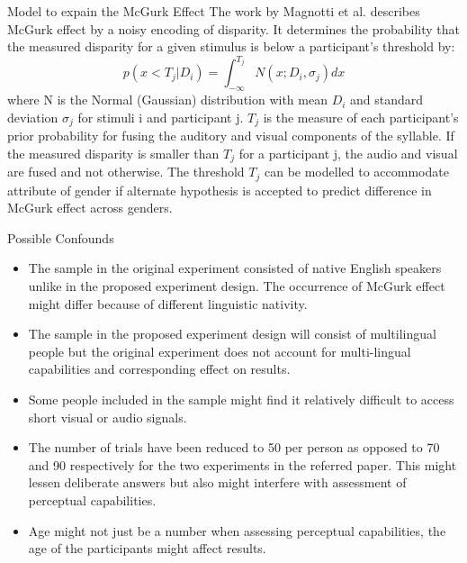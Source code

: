 \documentclass{article}
\begin{document}
\begin{psection}{Model to expain the McGurk Effect}
	The work by Magnotti et al. \cite{model} describes McGurk effect by a noisy encoding of disparity. It determines the probability that the measured disparity for a given stimulus is below a participant’s threshold by:
	\begin{equation}
		p(x < T_j | D_i) = \int_{-\infty}^{T_j} N(x;D_i,\sigma_j) dx 
	\end{equation}
	where N is the Normal (Gaussian) distribution with mean $D_i$ and standard deviation $\sigma_j$ for stimuli i and participant j. $T_j$ is the measure of each participant's prior probability for fusing the auditory and visual components of the syllable. If the measured disparity is smaller than $T_j$ for a participant j, the audio and visual are fused and not otherwise. The threshold $T_j$ can be modelled to accommodate attribute of gender if alternate hypothesis is accepted to predict difference in McGurk effect across genders.
\end{psection}

\begin{psection}{Possible Confounds}
	\begin{itemize}
		\item The sample in the original experiment consisted of native English speakers unlike in the proposed experiment design. The occurrence of McGurk effect might differ because of different linguistic nativity.
		\item The sample in the proposed experiment design will consist of multilingual people but the original experiment does not account for multi-lingual capabilities and corresponding effect on results.
		\item Some people included in the sample might find it relatively difficult to access short visual or audio signals.
		\item The number of trials have been reduced to 50 per person as opposed to 70 and 90 respectively for the two experiments in the referred paper. This might lessen deliberate answers but also might interfere with assessment of perceptual capabilities.
		\item Age might not just be a number when assessing perceptual capabilities, the age of the participants might affect results.
	\end{itemize}
\end{psection}
\end{document}
